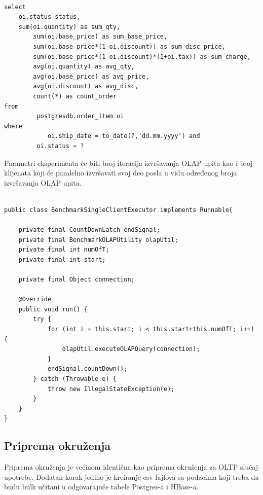 \documentclass[12pt,oneside]{memoir}
\begin{document}
\begin{lstlisting}[title={executeOLAPQuery},captionpos=t]

select
	oi.status status,
	sum(oi.quantity) as sum_qty,
        sum(oi.base_price) as sum_base_price,
        sum(oi.base_price*(1-oi.discount)) as sum_disc_price,
        sum(oi.base_price*(1-oi.discount)*(1+oi.tax)) as sum_charge,
        avg(oi.quantity) as avg_qty,
        avg(oi.base_price) as avg_price,
        avg(oi.discount) as avg_disc,
        count(*) as count_order
from
         postgresdb.order_item oi
where
        	oi.ship_date = to_date(?,'dd.mm.yyyy') and
         oi.status = ?

\end{lstlisting}

Parametri eksperimenta će biti broj iteracija izvršavanja OLAP upita kao i broj klijenata koji će paralelno izvršavati svoj deo posla u vidu određenog broja izvršavanja OLAP upita.



\begin{lstlisting}[title={BenchmarkSingleClientExecutor.java},captionpos=t]

public class BenchmarkSingleClientExecutor implements Runnable{

    private final CountDownLatch endSignal;
    private final BenchmarkOLAPUtility olapUtil;
    private final int numOfT;
    private final int start;

    private final Object connection;

    @Override
    public void run() {
        try {
            for (int i = this.start; i < this.start+this.numOfT; i++) {
                olapUtil.executeOLAPQuery(connection);
            }
            endSignal.countDown();
        } catch (Throwable e) {
            throw new IllegalStateException(e);
        }
    }
}

\end{lstlisting}

\subsection{Priprema okruženja}

Priprema okruženja je većinom identična kao priprema okruženja za OLTP slučaj upotrebe. Dodatan korak jedino je kreiranje csv fajlova sa podacima koji treba da budu bulk učitani u odgovarajuće tabele Postgres-a i HBase-a.
\pagebreak
{}
\end{document}
